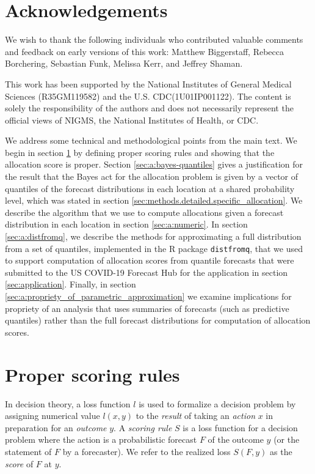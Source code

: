 \documentclass{article}\usepackage[]{graphicx}\usepackage[]{xcolor}
\begin{document}
\section*{Acknowledgements}

We wish to thank the following individuals who contributed valuable comments and feedback on early versions of this
work: Matthew Biggerstaff, Rebecca Borchering, Sebastian Funk, Melissa Kerr, and Jeffrey Shaman.

This work has been supported by the National Institutes of General Medical Sciences (R35GM119582) and the U.S.
CDC(1U01IP001122). The content is solely the responsibility of the authors and does not necessarily represent the
official views of NIGMS, the National Institutes of Health, or CDC.

\appendix
\appendixpage
\addappheadtotoc

We address some technical and methodological points from the main text. We begin in section \ref{sec:a:proper} by defining
proper scoring rules and showing that the allocation score is proper. Section \ref{sec:a:bayes-quantiles} gives a
justification for the result that the Bayes act for the allocation problem is given by a vector of quantiles of the
forecast distributions in each location at a shared probability level, which was stated in section
\ref{sec:methods.detailed.specific_allocation}. We describe the algorithm that we use to compute allocations given a
forecast distribution in each location in section \ref{sec:a:numeric}. In section \ref{sec:a:distfromq}, we describe the
methods for approximating a full distribution from a set of quantiles, implemented in the R package \verb`distfromq`,
that we used to support computation of allocation scores from quantile forecasts that were submitted to the US COVID-19
Forecast Hub for the application in section \ref{sec:application}. Finally, in section
\ref{sec:a:propriety_of_parametric_approximation} we examine implications for propriety of an analysis that uses summaries
of forecasts (such as predictive quantiles) rather than the full forecast distributions for computation of allocation
scores.

\section{Proper scoring rules}
\label{sec:a:proper}

In decision theory, a loss function $l$ is used to formalize a decision problem by assigning numerical value $l(x,y)$ to
the \emph{result} of taking an \emph{action} $x$ in preparation for an \emph{outcome} $y$. A \emph{scoring rule} $S$ is
a loss function for a decision problem where the action is a probabilistic forecast $F$ of the outcome $y$ (or the
statement of $F$ by a forecaster). We refer to the realized loss $S(F,y)$ as the \emph{score} of $F$ at $y$.
\end{document}
